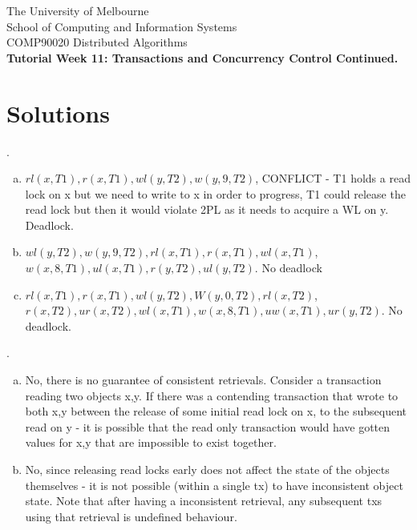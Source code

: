 \documentclass[12pt]{article}
\newcounter{question}
\newcommand{\question}[1]{
    \stepcounter{question}
    \thequestion. #1 \hfill
}
\begin{document}
\begin{center}
    {\sc The University of Melbourne
        \\
        School of Computing and Information Systems
        \\
    COMP90020 Distributed Algorithms}
    \bigskip \\
    {\Large\bf Tutorial Week 11: Transactions and Concurrency Control Continued.}
    \bigskip \\
\end{center}


\section*{Solutions}

\setcounter{question}{45}

\question{}

\begin{enumerate}[(a)]
    \item $rl(x,T1), r(x,T1), wl(y,T2), w(y,9,T2)$, CONFLICT - T1 holds a read lock on x but we need to write to x in order to progress, T1 could release the read lock but then it would violate 2PL as it needs to acquire a WL on y. Deadlock.
    \item $wl(y,T2), w(y,9,T2), rl(x,T1), r(x,T1), wl(x,T1)$,\\ $w(x,8,T1), ul(x,T1), r(y,T2), ul(y,T2)$. No deadlock
    \item $rl(x,T1), r(x,T1), wl(y,T2), W(y,0,T2), rl(x,T2)$, \\$r(x,T2), ur(x,T2), wl(x,T1), w(x,8,T1), uw(x,T1), ur(y,T2)$. No deadlock.
\end{enumerate}


\question{}

\begin{enumerate}[(a)]
    \item No, there is no guarantee of consistent retrievals. Consider a transaction reading two objects x,y. If there was a contending transaction that wrote to both x,y between the release of some initial read lock on x, to the subsequent read on y - it is possible that the read only transaction would have gotten values for x,y that are impossible to exist together.
    \item No, since releasing read locks early does not affect the state of the objects themselves - it is not possible (within a single tx) to have inconsistent object state. Note that after having a inconsistent retrieval, any subsequent txs using that retrieval is undefined behaviour.
\end{enumerate}
\end{document}
